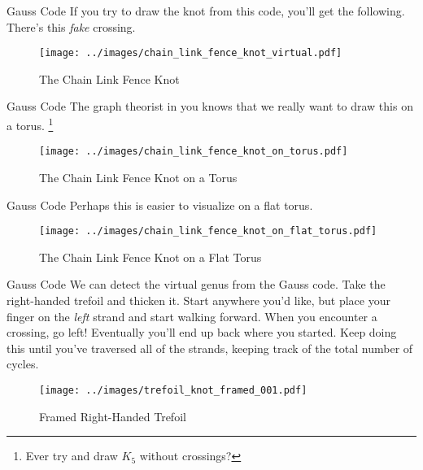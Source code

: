 \documentclass{beamer}
\begin{document}
    \begin{frame}{Gauss Code}
        If you try to draw the knot from this code, you'll get the following.
        There's this \textit{fake} crossing.
        \begin{figure}
            \centering
            \texttt{[image: ../images/chain\_link\_fence\_knot\_virtual.pdf]}
            \caption{The Chain Link Fence Knot}
            \label{fig:chain_link_fence_knot}
        \end{figure}
    \end{frame}
    \begin{frame}{Gauss Code}
        The graph theorist in you knows that we really want to draw this on a
        torus.%
        \footnote{Ever try and draw $K_{5}$ without crossings?}
        \begin{figure}
            \centering
            \texttt{[image: ../images/chain\_link\_fence\_knot\_on\_torus.pdf]}
            \caption{The Chain Link Fence Knot on a Torus}
            \label{fig:chain_link_fence_knot_on_torus}
        \end{figure}
    \end{frame}
    \begin{frame}{Gauss Code}
        Perhaps this is easier to visualize on a flat torus.
        \begin{figure}
            \centering
            \texttt{[image: ../images/chain\_link\_fence\_knot\_on\_flat\_torus.pdf]}
            \caption{The Chain Link Fence Knot on a Flat Torus}
            \label{fig:chain_link_fence_knot_on_flat_torus}
        \end{figure}
    \end{frame}
    \begin{frame}{Gauss Code}
        We can detect the virtual genus from the Gauss code. Take the
        right-handed trefoil and thicken it. Start anywhere you'd like, but
        place your finger on the \textit{left} strand and start walking forward.
        When you encounter a crossing, go left! Eventually you'll end up back
        where you started. Keep doing this until you've traversed all of the
        strands, keeping track of the total number of cycles.
        \begin{figure}
            \centering
            \texttt{[image: ../images/trefoil\_knot\_framed\_001.pdf]}
            \caption{Framed Right-Handed Trefoil}
            \label{fig:trefoil_knot_framed_001}
        \end{figure}
    \end{frame}
\end{document}
